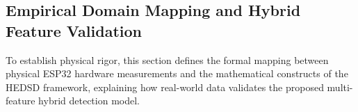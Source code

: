 \subsection{Empirical Domain Mapping and Hybrid Feature Validation}
\label{subsec:domain_mapping}

To establish physical rigor, this section defines the formal mapping between physical ESP32 hardware measurements and the mathematical constructs of the \ac{HEDSD} framework, explaining how real-world data validates the proposed multi-feature hybrid detection model.

\begin{table}[htbp]
\caption{Domain Mapping: ESP32 Measurements to HEDSD Mathematical Features}
\label{tab_domain_mapping}
\centering
\small
\renewcommand{\arraystretch}{1.2}
\end{table}

